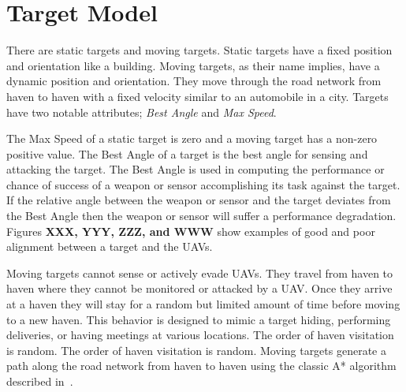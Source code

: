 \chapter{Target Model}
There are static targets and moving targets.  Static targets have a fixed position and orientation like a building.  Moving targets, as their name implies, have a dynamic position and orientation.  They move through the road network from haven to haven with a fixed velocity similar to an automobile in a city.  Targets have two notable attributes; \textit{Best Angle} and \textit{Max Speed}.

The Max Speed of a static target is zero and a moving target has a non-zero positive value.  The Best Angle of a target is the best angle for sensing and attacking the target.  The Best Angle is used in computing the performance or chance of success of a weapon or sensor accomplishing its task against the target.  If the relative angle between the weapon or sensor and the target deviates from the Best Angle then the weapon or sensor will suffer a performance degradation.  Figures \textbf{XXX, YYY, ZZZ, and WWW} show examples of good and poor alignment between a target and the UAVs.


Moving targets cannot sense or actively evade UAVs.  They travel from haven to haven where they cannot be monitored or attacked by a UAV.  Once they arrive at a haven they will stay for a random but limited amount of time before moving to a new haven.  This behavior is designed to mimic a target hiding, performing deliveries, or having meetings at various locations.  The order of haven visitation is random.  The order of haven visitation is random.  Moving targets generate a path along the road network from haven to haven using the classic A* algorithm described in~\cite{wiki:astar}.

